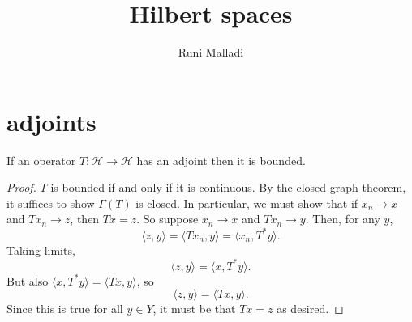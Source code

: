 \documentclass[12pt]{article}
\title{Hilbert spaces}
\author{Runi Malladi}
\begin{document}
\maketitle

\section{adjoints} %

\begin{proposition}
	If an operator $T:\mathcal{H}\to\mathcal{H}$ has an adjoint then it is bounded.
\end{proposition}
\begin{proof}
	$T$ is bounded if and only if it is continuous. By the closed graph theorem, it suffices to show $\Gamma(T)$ is closed. In particular, we must show that if $x_n\to x$ and $Tx_n\to z$, then $Tx=z$. So suppose $x_n\to x$ and $Tx_n\to y$. Then, for any $y$,
	\begin{equation*}
		\langle z, y\rangle = \langle Tx_n, y\rangle = \langle x_n, T^\ast y\rangle. 
	\end{equation*}
	Taking limits, 
	\begin{equation*}
		\langle z, y\rangle = \langle x, T^\ast y\rangle.
	\end{equation*}
	But also $\langle x, T^\ast y\rangle = \langle Tx, y\rangle$, so 
	\begin{equation*}
		\langle z, y\rangle = \langle Tx, y\rangle.
	\end{equation*}
	Since this is true for all $y\in Y$, it must be that $Tx=z$ as desired.
\end{proof}

\end{document}
